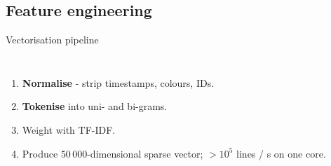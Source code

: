 \documentclass[15pt,aspectratio=169]{beamer}
\newcommand{\tfidf}{TF-IDF\xspace}
\begin{document}
\subsection{Feature engineering}
\begin{frame}{Vectorisation pipeline }
\begin{columns}
    \begin{enumerate}[<+->]
      \item \textbf{Normalise} - strip timestamps, colours, IDs.
      \item \textbf{Tokenise} into uni- and bi-grams.
      \item Weight with \tfidf.
      \item Produce \(50\,000\)-dimensional sparse vector; \(>10^{5}\) lines / s on one core.
    \end{enumerate}
    \centering
\end{columns}
\end{frame}

\end{document}
